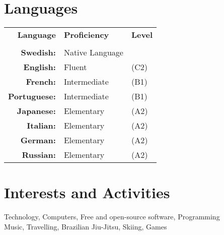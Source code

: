 \documentclass[a4paper,10pt]{article}
\begin{document}
\section{Languages}
\begin{tabular}{rll}
\large\textbf{Language}&\large\textbf{Proficiency}&\large\textbf{Level}\\
\\
\textbf{Swedish:}&Native Language\\
\textbf{English:}&Fluent&(C2)\\
\textbf{French:}&Intermediate&(B1)\\
\textbf{Portuguese:}&Intermediate&(B1)\\
\textbf{Japanese:}&Elementary&(A2)\\
\textbf{Italian:}&Elementary&(A2)\\
\textbf{German:}&Elementary&(A2) \\
\textbf{Russian:}&Elementary&(A2)
\end{tabular}

\section{Interests and Activities}
Technology, Computers, Free and open-source software, Programming\\
Music, Travelling, Brazilian Jiu-Jitsu, Skiing, Games
\end{document}
